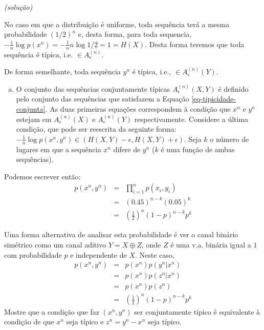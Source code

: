 \begin{frame}[allowframebreaks]
\begin{exercise}
  \textit{(solução)}

  No caso em que a distribuição é uniforme, toda sequência terá a mesma probabilidade $(1/2)^n$ 
  e, desta forma, para toda sequencia, $-\frac{1}{n} \log p(x^n) = -\frac{1}{n} n \log 1/2 = 1 = H(X)$.
  Desta forma teremos que toda sequência é típica, i.e. $\in A_{\epsilon}^{(n)}$.

  De forma semelhante, toda sequência $y^n$ é típica, i.e., $\in A_\epsilon^{(n)}(Y)$.

  \examplebreak
  \begin{enumerate}[c)]
  \item O conjunto das sequências conjuntamente típicas $A_\epsilon^{(n)}(X,Y)$ é definido
  pelo conjunto das sequências que satisfazem a Equação \ref{eq-tipicidade-conjunta}.
  As duas primeiras equações correspondem à condição que $x^n$ e $y^n$ estejam em
  $A_\epsilon^{(n)}(X)$ e $A_\epsilon^{(n)}(Y)$ respectivamente. Considere a última condição,
  que pode ser reescrita da seguinte forma: 
  $-\frac{1}{n} \log p(x^n, y^n) \in \left( H(X,Y) - \epsilon, H(X,Y) + \epsilon \right)$.
  Seja $k$ o número de lugares em que a sequência $x^n$ difere de $y^n$ ($k$ é uma função
  de ambas sequências). 
  \end{enumerate}
  \examplebreak

  Podemos escrever então:
  \begin{eqnarray}
  p(x^n, y^n) &=& \prod_{i=1}^{n} p(x_i, y_i) \nonumber \\
	&=& (0.45)^{n-k} (0.05)^k \nonumber \\
	&=& \left( \frac{1}{2} \right)^n (1-p)^{n-k} p^k
  \end{eqnarray}

  \examplebreak

  Uma forma alternativa de analisar esta probabilidade é ver o canal binário simétrico como
  um canal aditivo $Y = X \oplus Z$, onde $Z$ é uma v.a. binária igual a $1$ com 
  probabilidade $p$ e independente de $X$. Neste caso,
  \begin{eqnarray}
  p(x^n, y^n) &=& p(x^n) p(y^n|x^n) \nonumber \\
	&=& p(x^n) p(z^n|x^n) \nonumber \\
	&=& p(x^n) p(z^n) \nonumber \\
	&=& \left( \frac{1}{2} \right)^n (1-p)^{n-k} p^k
  \end{eqnarray}
  Mostre que a condição que faz $(x^n,y^n)$ ser conjuntamente típico é equivalente
  à condição de que $x^n$ seja típico e $z^n = y^n - x^n$ seja típico.


\end{exercise}
\end{frame}
